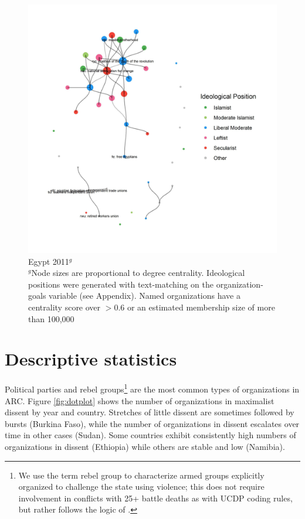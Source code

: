 \begin{figure}
    \centering
    \includegraphics[width = 1.1\columnwidth]{img/egypt_2011.jpg}
    \caption{Egypt 2011$^g$ \\
        \footnotesize{$^g$Node sizes are proportional to degree centrality. Ideological positions were generated with text-matching on the organization-goals variable (see Appendix). Named organizations have a centrality score over $>0.6$ or an estimated membership size of more than 100,000}
}
    \label{Fig: Net1}
\end{figure}


\clearpage

\doublespacing


\section{Descriptive statistics}

Political parties and rebel groups\footnote{We use the term rebel group to characterize armed groups explicitly organized to challenge the state using violence; this does not require involvement in conflicts with 25+ battle deaths as with UCDP coding rules, but rather follows the logic of \citet{Lewis2020}.} are the most common types of organizations in ARC. Figure \ref{fig:dotplot} shows the number of organizations in maximalist dissent by year and country. Stretches of little dissent are sometimes followed by bursts (Burkina Faso), while the number of organizations in dissent escalates over time in other cases (Sudan). Some countries exhibit consistently high numbers of organizations in dissent (Ethiopia) while others are stable and low (Namibia). 

